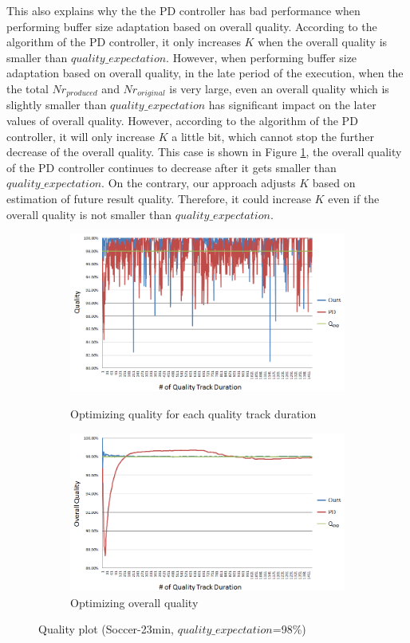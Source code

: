 \documentclass[a4paper, 11pt, twoside]{report}
\begin{document}
This also explains why the the PD controller has bad performance when performing buffer size adaptation based on overall quality. According to the algorithm of the PD controller, it only increases $K$ when the overall quality is smaller than $quality\_expectation$. However, when performing buffer size adaptation based on overall quality, in the late period of the execution, when the the total $Nr_{produced}$ and $Nr_{original}$ is very large, even an overall quality which is slightly smaller than $quality\_expectation$ has significant impact on the later values of overall quality. However, according to the algorithm of the PD controller, it will only increase $K$ a little bit, which cannot stop the further decrease of the overall quality. This case is shown in Figure \ref{fig:quality-plot-b}, the overall quality of the PD controller continues to decrease after it gets smaller than $quality\_expectation$. On the contrary, our approach adjusts $K$ based on estimation of future result quality. Therefore, it could increase $K$ even if the overall quality is not smaller than $quality\_expectation$.\\

\begin{figure}[H]
	\centering
	\begin{subfigure}[t]{5in}
		\centering
		\includegraphics[width=5in]{quality-plot}
		\caption{Optimizing quality for each quality track duration}
		\label{fig:quality-plot-a}
		\hspace{5pt}
		\includegraphics[width=5in]{quality-plot-overallquality}
		\caption{Optimizing overall quality}	
		\label{fig:quality-plot-b}
	\end{subfigure}
	\caption{Quality plot (Soccer-23min, $quality\_expectation$=98\%)}
	\label{fig:quality-plot}
\end{figure}
\end{document}

